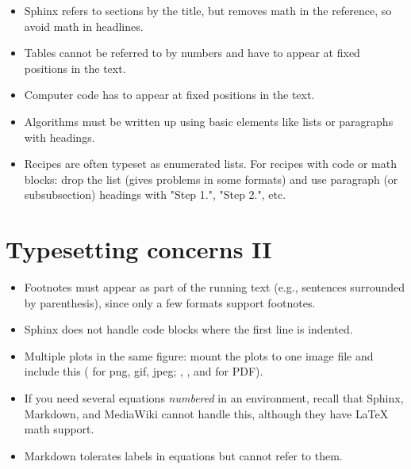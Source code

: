 \documentclass[%
twoside,                 %
draft,                   %
final,                   %
chapterprefix=true,      %
open=right               %
10pt]{book}
\begin{document}
\begin{shadedquoteBlue}
\begin{itemize}
 \item Sphinx refers to sections by the title, but removes math in the
   reference, so avoid math in headlines.

 \item Tables cannot be referred to by numbers and have to appear at
   fixed positions in the text.

 \item Computer code has to appear at fixed positions in the text.

 \item Algorithms must be written up using basic elements like lists or
   paragraphs with headings.

 \item Recipes are often typeset as enumerated lists. For recipes with
   code or math blocks: drop the list (gives problems in some formats)
   and use paragraph (or subsubsection) headings with "Step 1.",
   "Step 2.", etc.
\end{itemize}

\noindent

\section*{Typesetting concerns II}

\begin{itemize}
 \item Footnotes must appear as part of the running text (e.g., sentences
   surrounded by parenthesis), since only a few formats support footnotes.

 \item Sphinx does not handle code blocks where the first line is indented.

 \item Multiple plots in the same figure: mount the plots to one image
   file and include this ( for png, gif, jpeg; , ,
   and  for PDF).

 \item If you need several equations \emph{numbered} in an  environment,
   recall that Sphinx, Markdown, and MediaWiki cannot handle this,
   although they have {\LaTeX} math support.

 \item Markdown tolerates labels in equations but cannot refer to them.
\end{itemize}

\noindent


\end{shadedquoteBlue}
\end{document}
